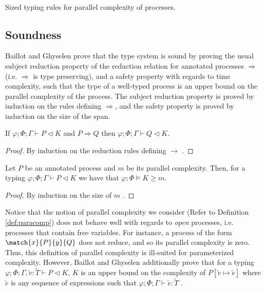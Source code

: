 \begin{table*}[!ht]
\begin{framed}
\begin{align*}
    \end{align*}\vspace{-1em}\end{framed}
    \smallskip
    \caption{Sized typing rules for parallel complexity of processes.}
    \label{tab:sizedprocesstypingrules}
\end{table*}
%
\subsection{Soundness}
Baillot and Ghyselen \cite{BaillotGhyselen2021} prove that the type system is sound by proving the usual subject reduction property of the reduction relation for annotated processes $\Rightarrow$ (i.e. $\Rightarrow$ is type preserving), and a safety property with regards to time complexity, such that the type of a well-typed process is an upper bound on the parallel complexity of the process. The subject reduction property is proved by induction on the rules defining $\Rightarrow$, and the safety property is proved by induction on the size of the span.
\begin{theorem}
If $\varphi;\Phi;\Gamma\vdash P \triangleleft K$ and $P \Rightarrow Q$ then $\varphi;\Phi;\Gamma\vdash Q \triangleleft K$.
\begin{proof}
By induction on the reduction rules defining $\longrightarrow$ \cite{BaillotGhyselen2021}.
\end{proof}
\end{theorem}
%

%
\begin{theorem}
Let $P$ be an annotated process and $m$ be its parallel complexity. Then, for a typing $\varphi;\Phi;\Gamma\vdash P \triangleleft K$ we have that $\varphi;\Phi\vDash K \geq m$.
\begin{proof}
By induction on the size of $m$ \cite{BaillotGhyselen2021}. 
\end{proof}
\end{theorem}
%
Notice that the notion of parallel complexity we consider (Refer to Definition \ref{def:paracomp}) does not behave well with regards to \textit{open} processes, i.e. processes that contain free variables. For instance, a process of the form $\match{x}{P}{y}{Q}$ does not reduce, and so its parallel complexity is zero. Thus, this definition of parallel complexity is ill-suited for parameterized complexity. However, Baillot and Ghyselen additionally prove that for a typing $\varphi;\Phi;\Gamma,\widetilde{v}:\widetilde{T}\vdash P \triangleleft K$, $K$ is an upper bound on the complexity of $P[\widetilde{v}\mapsto\widetilde{e}]$ where $\widetilde{e}$ is any sequence of expressions such that $\varphi;\Phi;\Gamma\vdash \widetilde{e} : \widetilde{T}$ \cite{BaillotGhyselen2021}.
%
